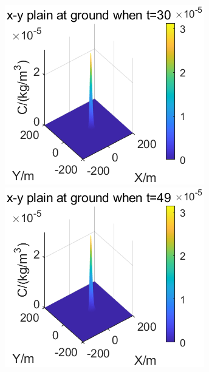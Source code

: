 \documentclass{article}
\begin{document}
	\begin{figure}[htbp]
		\begin{minipage}{0.33\textwidth}
			\includegraphics[width=\textwidth]{pics/g=1,t=30.png}
		\end{minipage}
		\begin{minipage}{0.33\textwidth}
			\includegraphics[width=\textwidth]{pics/g=1,t=60.png}
		\end{minipage}

\end{figure}
\end{document}
